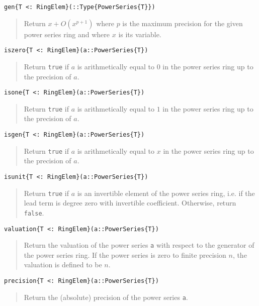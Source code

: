 \documentclass[a4paper,10pt]{article}
\newcommand{\code}{\lstinline}
\newcommand{\desc}[1]{\vspace{-3mm}\begin{quote}#1\end{quote}}
\begin{document}
\begin{lstlisting}
gen{T <: RingElem}(::Type{PowerSeries{T}})
\end{lstlisting}

\desc{Return $x + O(x^{p+1})$ where $p$ is the maximum precision for the
given power series ring and where $x$ is its variable.}

\begin{lstlisting}
iszero{T <: RingElem}(a::PowerSeries{T})
\end{lstlisting}

\desc{Return \code{true} if $a$ is arithmetically equal to $0$ in the
power series ring up to the precision of $a$.}

\begin{lstlisting}
isone{T <: RingElem}(a::PowerSeries{T})
\end{lstlisting}

\desc{Return \code{true} if $a$ is arithmetically equal to $1$ in the
power series ring up to the precision of $a$.}

\begin{lstlisting}
isgen{T <: RingElem}(a::PowerSeries{T})
\end{lstlisting}

\desc{Return \code{true} if $a$ is arithmetically equal to $x$ in the
power series ring up to the precision of $a$.}

\begin{lstlisting}
isunit{T <: RingElem}(a::PowerSeries{T})
\end{lstlisting}

\desc{Return \code{true} if $a$ is an invertible element of the power series
ring, i.e. if the lead term is degree zero with invertible coefficient.
Otherwise, return \code{false}.}

\begin{lstlisting}
valuation{T <: RingElem}(a::PowerSeries{T})
\end{lstlisting}

\desc{Return the valuation of the power series \code{a} with respect to the
generator of the power series ring. If the power series is zero to finite
precision $n$, the valuation is defined to be $n$.}

\begin{lstlisting}
precision{T <: RingElem}(a::PowerSeries{T})
\end{lstlisting}

\desc{Return the (absolute) precision of the power series \code{a}.}
\end{document}
